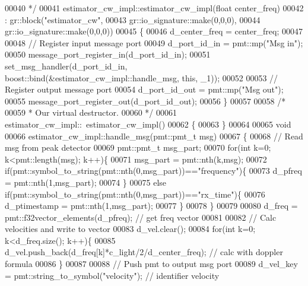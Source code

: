 \begin{DoxyCode}
00040 \textcolor{comment}{     */}
00041     estimator_cw_impl::estimator_cw_impl(\textcolor{keywordtype}{float} center_freq)
00042       : gr::block(\textcolor{stringliteral}{"estimator\_cw"},
00043               gr::io\_signature::make(0,0,0),
00044               gr::io\_signature::make(0,0,0))
00045     \{
00046         d_center_freq = center_freq;
00047         
00048         \textcolor{comment}{// Register input message port}
00049         d_port_id_in = pmt::mp(\textcolor{stringliteral}{"Msg in"});
00050         message\_port\_register\_in(d_port_id_in);
00051         set\_msg\_handler(d_port_id_in, boost::bind(&estimator_cw_impl::handle_msg, \textcolor{keyword}{this}, \_1));
00052         
00053         \textcolor{comment}{// Register output message port}
00054         d_port_id_out = pmt::mp(\textcolor{stringliteral}{"Msg out"});
00055         message\_port\_register\_out(d_port_id_out);
00056     \}
00057 
00058     \textcolor{comment}{/*}
00059 \textcolor{comment}{     * Our virtual destructor.}
00060 \textcolor{comment}{     */}
00061     estimator_cw_impl::~estimator_cw_impl()
00062     \{
00063     \}
00064 
00065     \textcolor{keywordtype}{void}
00066     estimator_cw_impl::handle_msg(pmt::pmt\_t msg)
00067     \{
00068         \textcolor{comment}{// Read msg from peak detector}
00069         pmt::pmt\_t msg\_part;
00070         \textcolor{keywordflow}{for}(\textcolor{keywordtype}{int} k=0; k<pmt::length(msg); k++)\{
00071             msg\_part = pmt::nth(k,msg);
00072             \textcolor{keywordflow}{if}(pmt::symbol\_to\_string(pmt::nth(0,msg\_part))==\textcolor{stringliteral}{"frequency"})\{
00073                 d_pfreq = pmt::nth(1,msg\_part);
00074             \}
00075             \textcolor{keywordflow}{else} \textcolor{keywordflow}{if}(pmt::symbol\_to\_string(pmt::nth(0,msg\_part))==\textcolor{stringliteral}{"rx\_time"})\{
00076                 d_ptimestamp = pmt::nth(1,msg\_part);
00077             \}
00078         \}
00079         
00080         d_freq = pmt::f32vector\_elements(d_pfreq); \textcolor{comment}{// get freq vector}
00081         
00082         \textcolor{comment}{// Calc velocities and write to vector}
00083         d_vel.clear();
00084         \textcolor{keywordflow}{for}(\textcolor{keywordtype}{int} k=0; k<d_freq.size(); k++)\{
00085             d_vel.push\_back(d_freq[k]*c_light/2/d_center_freq); \textcolor{comment}{// calc with doppler formula}
00086         \}
00087         
00088         \textcolor{comment}{// Push pmt to output msg port}
00089         d_vel_key = pmt::string\_to\_symbol(\textcolor{stringliteral}{"velocity"}); \textcolor{comment}{// identifier velocity}

\end{DoxyCode}
